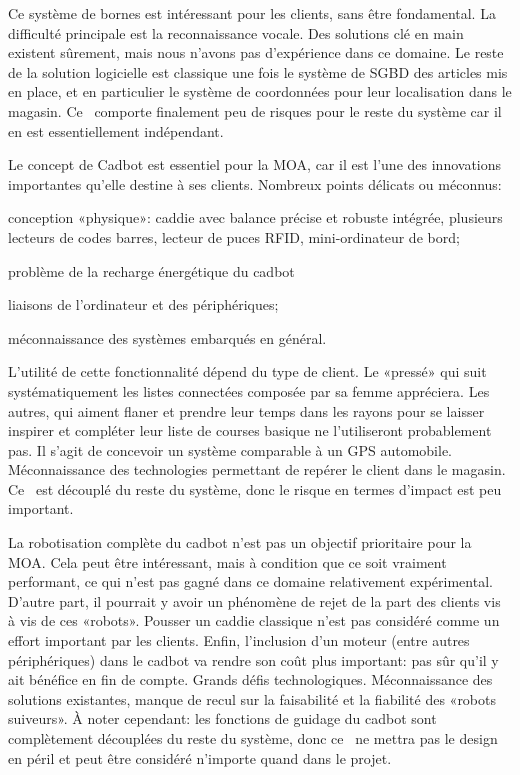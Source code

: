 \startnote
{} Ce système de bornes est intéressant pour les clients, sans être fondamental.
 La difficulté principale est la reconnaissance vocale. 
Des solutions clé en main existent sûrement, mais nous n'avons pas d'expérience dans ce domaine.
Le reste de la solution logicielle est classique une fois le système de SGBD des articles mis en place, et en particulier le système de coordonnées pour leur localisation dans le magasin.
Ce \cu\ comporte finalement peu de risques pour le reste du système car il en est essentiellement indépendant.
\stopnote

\startnote
{} Le concept de Cadbot est essentiel pour la MOA, car il est l'une des innovations importantes qu'elle destine à ses clients.
 Nombreux points délicats ou méconnus:
\startitemize
\item conception «physique»: caddie avec balance précise et robuste intégrée, plusieurs lecteurs de codes barres, lecteur de puces RFID, mini-ordinateur de bord;
\item problème de la recharge énergétique du cadbot
\item liaisons de l'ordinateur et des périphériques;
\item méconnaissance des systèmes embarqués en général.
\stopitemize
\stopnote

\startnote
{} L'utilité de cette fonctionnalité dépend du type de client.
Le «pressé» qui suit systématiquement les listes connectées composée par sa femme appréciera.
Les autres, qui aiment flaner et prendre leur temps dans les rayons pour se laisser inspirer et compléter leur liste de courses basique ne l'utiliseront probablement pas.
 Il s'agit de concevoir un système comparable à un GPS automobile.
Méconnaissance des technologies permettant de repérer le client dans le magasin.
Ce \cu\ est découplé du reste du système, donc le risque en termes d'impact est peu important.
\stopnote

\startnote
{} La robotisation complète du cadbot n'est pas un objectif prioritaire pour la MOA.
Cela peut être intéressant, mais à condition que ce soit vraiment performant, ce qui n'est pas gagné dans ce domaine relativement expérimental. 
D'autre part, il pourrait y avoir un phénomène de rejet de la part des clients vis à vis de ces «robots».
Pousser un caddie classique n'est pas considéré comme un effort important par les clients.
Enfin, l'inclusion d'un moteur (entre autres périphériques) dans le cadbot va rendre son coût plus important: pas sûr qu'il y ait bénéfice en fin de compte.
 Grands défis technologiques. Méconnaissance des solutions existantes, manque de recul sur la faisabilité et la fiabilité des «robots suiveurs». 
À noter cependant: les fonctions de guidage du cadbot sont complètement découplées du reste du système, donc ce \cu\ ne mettra pas le design en péril et peut être considéré n'importe quand dans le projet.
\stopnote





